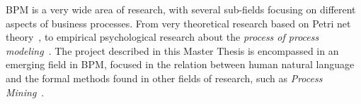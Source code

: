 BPM is a very wide area of research, with several sub-fields focusing on
different aspects of business processes. From very theoretical research based on
Petri net theory~\cite{van1998application}, to empirical psychological research
about the \emph{process of process modeling}~\cite{pinggera2010investigating}.
The project described in this Master Thesis is encompassed in an emerging field
\cite{vanderaa2018challenges} in BPM, focused in the relation between human
natural language and the formal methods found in other fields of research, such
as \emph{Process Mining}~\cite{van2016process}.






